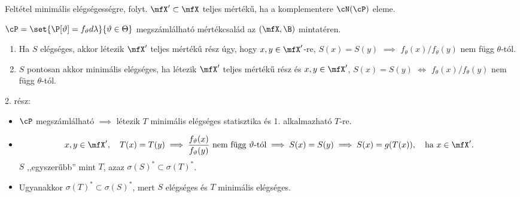 \documentclass[aspectratio=169,notheorems,9pt,\option]{beamer}
\begin{document}
\begin{frame}{Feltétel minimális elégségességre, folyt.}
  $\mfX'\subset\mfX$ teljes mértékű, ha a komplementere $\cN(\cP)$ eleme.
  \begin{theorem} $\cP=\set{\P[\theta]=f_\theta d\lambda}{\theta\in\Theta}$ megszámlálható
     mértékcsalád az $(\mfX,\B)$ mintatéren.
    \begin{enumerate}[<*>]
      \item Ha $S$ elégséges, akkor létezik $\mfX'$ teljes mértékű rész úgy, hogy $x,y\in\mfX'$-re, $S(x)=S(y)$ $\implies$  
      $f_\theta(x)/f_\theta(y)$ nem függ $\theta$-tól.
      \item $S$ pontosan akkor minimális elégséges, ha létezik $\mfX'$ teljes mértékű rész és $x,y\in\mfX'$, 
      $S(x)=S(y)$ $\iff$  $f_\theta(x)/f_\theta(y)$ nem függ $\theta$-tól.
    \end{enumerate}
  \end{theorem}
  2. rész:
  \begin{itemize}
    \item %
    $\cP$ megszámlálható $\implies$ 
    létezik $T$ minimális elégséges statisztika és 1. alkalmazható $T$-re.
    
    \item %
    \begin{displaymath}
      x,y\in\mfX',\quad T(x)=T(y)
      \implies %
      \text{$\frac{f_\theta(x)}{f_\theta(y)}$ nem függ $\theta$-tól}
      \implies
      S(x)=S(y)
      \implies
      S(x)=g(T(x)),\quad\text{ha $x\in\mfX'$}.
    \end{displaymath}
    $S$ ,,egyszerűbb'' mint $T$, azaz $\sigma(S)^*\subset\sigma(T)^*$.
    \item Ugyanakkor $\sigma(T)^*\subset\sigma(S)^*$, mert $S$ elégséges és $T$ minimális elégséges.
  \end{itemize}
\end{frame}
\end{document}
